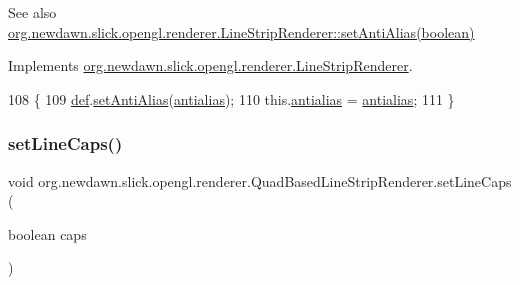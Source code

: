 \begin{DoxySeeAlso}{See also}
\mbox{\hyperlink{interfaceorg_1_1newdawn_1_1slick_1_1opengl_1_1renderer_1_1_line_strip_renderer_a849fde4a1b5b6981e77978bb3afa2b3b}{org.\+newdawn.\+slick.\+opengl.\+renderer.\+Line\+Strip\+Renderer\+::set\+Anti\+Alias(boolean)}} 
\end{DoxySeeAlso}


Implements \mbox{\hyperlink{interfaceorg_1_1newdawn_1_1slick_1_1opengl_1_1renderer_1_1_line_strip_renderer_a849fde4a1b5b6981e77978bb3afa2b3b}{org.\+newdawn.\+slick.\+opengl.\+renderer.\+Line\+Strip\+Renderer}}.


\begin{DoxyCode}
108                                                 \{
109         \mbox{\hyperlink{classorg_1_1newdawn_1_1slick_1_1opengl_1_1renderer_1_1_quad_based_line_strip_renderer_ace068cf3ac38fc9ef4a9025096fb3279}{def}}.\mbox{\hyperlink{classorg_1_1newdawn_1_1slick_1_1opengl_1_1renderer_1_1_default_line_strip_renderer_adec638ecbe7cb11adb68d6ad05e47940}{setAntiAlias}}(\mbox{\hyperlink{classorg_1_1newdawn_1_1slick_1_1opengl_1_1renderer_1_1_quad_based_line_strip_renderer_a9da96cac3374734801a36209293b72fe}{antialias}});
110         this.\mbox{\hyperlink{classorg_1_1newdawn_1_1slick_1_1opengl_1_1renderer_1_1_quad_based_line_strip_renderer_a9da96cac3374734801a36209293b72fe}{antialias}} = \mbox{\hyperlink{classorg_1_1newdawn_1_1slick_1_1opengl_1_1renderer_1_1_quad_based_line_strip_renderer_a9da96cac3374734801a36209293b72fe}{antialias}};
111     \}
\end{DoxyCode}
\mbox{\label{classorg_1_1newdawn_1_1slick_1_1opengl_1_1renderer_1_1_quad_based_line_strip_renderer_a7b6834b1bd47220f6ebd45ee60672b30}} 
\subsubsection{\texorpdfstring{set\+Line\+Caps()}{setLineCaps()}}
{\footnotesize\ttfamily void org.\+newdawn.\+slick.\+opengl.\+renderer.\+Quad\+Based\+Line\+Strip\+Renderer.\+set\+Line\+Caps (\begin{DoxyParamCaption}\item[{boolean}]{caps }\end{DoxyParamCaption})\hspace{0.3cm}{\ttfamily [inline]}}

